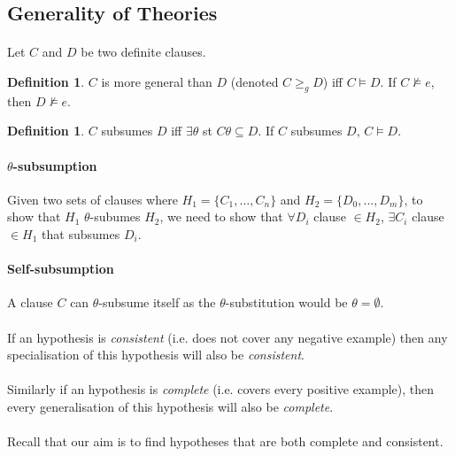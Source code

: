 \documentclass{article}
\theoremstyle{plain}
\theoremstyle{definition}
\newtheorem{defn}[thm]{Definition} %
\begin{document}
\begin{multicols}{2}
\subsection{Generality of Theories}

\paragraph{} Let $C$ and $D$ be two definite clauses. 

\begin{defn} $C$ is more general than $D$ (denoted $C \geq_g D$) iff $C \models D$. If $C \not\models e$, then $D \not\models e$. \end{defn}

\begin{defn} $C$ subsumes $D$ iff $\exists \theta$ st $C\theta \subseteq D$. If $C$ subsumes $D$, $C \models D$. \end{defn}

\paragraph{$\theta$-subsumption} Given two sets of clauses where $H_1 = \{C_1,... , C_n\}$ and $H_2 = \{D_0,... , D_m\}$, to show that $H_1$ $\theta$-subumes $H_2$, we need to show that $\forall D_i$ clause $\in H_2$, $\exists C_i$ clause $\in H_1$ that subsumes $D_i$.

\paragraph{Self-subsumption} A clause $C$ can $\theta$-subsume itself as the $\theta$-substitution would be $\theta = \emptyset$.

\paragraph{} If an hypothesis is \textit{consistent} (i.e. does not cover any negative example) then any specialisation of this hypothesis will also be \textit{consistent}.

\paragraph{} Similarly if an hypothesis is \textit{complete} (i.e. covers every positive example), then every generalisation of this hypothesis will also be \textit{complete}.

\paragraph{} Recall that our aim is to find hypotheses that are both complete and consistent.


\end{multicols}
\end{document}
